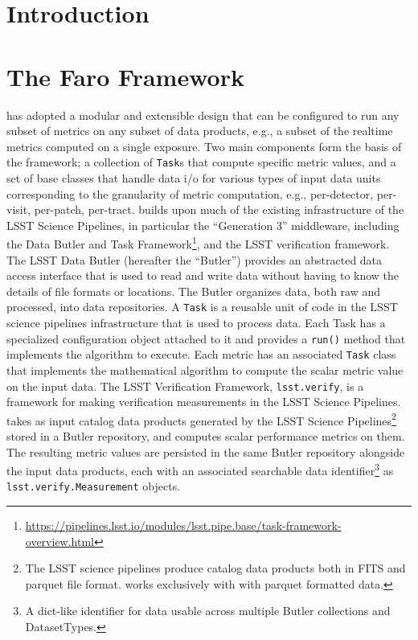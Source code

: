 \section{Introduction} \label{sec:intro}


\section{The Faro Framework} \label{sec:faro}

\faro has adopted a modular and extensible design that can be configured  to run any subset of metrics on any subset of data products, e.g., a  subset of the realtime metrics computed on a single exposure. 
Two main components form the basis of the \faro framework;  a collection of \texttt{Task}s that compute specific metric values, and a set of base classes that handle data i/o for various types of input data units corresponding to the granularity of metric computation, e.g., per-detector, per-visit, per-patch, per-tract. 
\faro builds upon much of the existing infrastructure of the LSST Science Pipelines, in particular the ``Generation 3'' middleware, including the Data Butler and Task Framework\footnote{\url{https://pipelines.lsst.io/modules/lsst.pipe.base/task-framework-overview.html}}\cite{dmtn-229}, and the LSST verification framework\cite{SQR-019}. 
The LSST Data Butler (hereafter the ``Butler'') provides an abstracted data access interface that is used to read and write data without having to know the details of file formats or locations.
The Butler organizes data, both raw and processed, into data repositories.
A \texttt{Task} is a reusable unit of code in the LSST science pipelines infrastructure that is used to process data.
Each Task has a specialized configuration object attached to it and provides a \texttt{run()} method that implements the algorithm to execute. 
Each \faro metric has an associated \texttt{Task} class that implements the mathematical algorithm to compute the scalar metric value on the input data.
The LSST Verification Framework, \texttt{lsst.verify}, is a framework for making verification measurements in the LSST Science Pipelines.
\faro takes as input catalog data products generated by the LSST Science Pipelines\footnote{The LSST science pipelines produce catalog data products both in FITS and parquet file format. \faro works exclusively with with parquet formatted data.} stored in a Butler repository, 
 and computes scalar performance metrics on them. 
The resulting metric values
are persisted in the same Butler repository alongside the input data products, each with an associated searchable data identifier\footnote{A dict-like identifier for data usable across multiple Butler collections and DatasetTypes.} as \texttt{lsst.verify.Measurement} objects.

